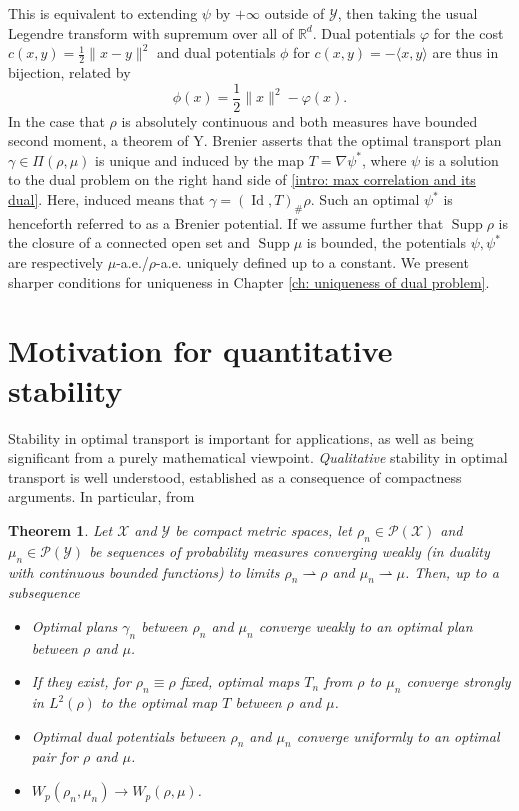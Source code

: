 \documentclass[11pt, oneside, titlepage]{book}
\theoremstyle{plain}
\newtheorem{theorem}{Theorem}[chapter]
\theoremstyle{definition}
\newcommand{\R}{\mathbb{R}}
\newcommand{\X}{\mathcal{X}}
\newcommand{\Y}{\mathcal{Y}}
\DeclareMathOperator{\id}{Id}
\DeclareMathOperator{\supp}{Supp}
\begin{document}
This is equivalent to extending $\psi$ by $+ \infty$ outside of $\Y$, then taking the usual Legendre transform with supremum over all of $\R^d$. Dual potentials $\varphi$ for the cost $c(x, y) = \frac{1}{2}\|x-y\|^2$ and dual potentials $\phi$ for $c(x, y) = -\langle x, y \rangle$ are thus in bijection, related by
\begin{equation*}
    \phi(x) = \frac{1}{2}\|x\|^2 - \varphi(x).
\end{equation*}
In the case that $\rho$ is absolutely continuous and both measures have bounded second moment, a theorem of Y. Brenier \cite{brenier1991polar} asserts that the optimal transport plan $\gamma \in \Pi(\rho, \mu)$ is unique and induced by the map $T = \nabla \psi^*$, where $\psi$ is a solution to the dual problem on the right hand side of \eqref{intro: max correlation and its dual}. Here, induced means that $\gamma = (\id, T)_\#\rho$. Such an optimal $\psi^*$ is henceforth referred to as a Brenier potential. If we assume further that  $\supp\rho$ is the closure of a connected open set and $\supp \mu$ is bounded, the potentials $\psi, \psi^*$ are respectively $\mu$-a.e./$\rho$-a.e. uniquely defined up to a constant\cite[Proposition 7.18]{santambrogio2015optimal}. We present sharper conditions for uniqueness in Chapter \ref{ch: uniqueness of dual problem}.




\section{Motivation for quantitative stability}


Stability in optimal transport is important for applications, as well as being significant from a purely mathematical viewpoint. \textit{Qualitative} stability in optimal transport is well understood, established as a consequence of compactness arguments. In particular, from \cite[Section 1.6.4]{santambrogio2015optimal}
\begin{theorem}
\label{intro: qualitative stability}
    Let $\X$ and $\Y$ be compact metric spaces, let $\rho_n \in \mathcal{P}(\X)$ and $\mu_n \in \mathcal{P}(\Y)$ be sequences of probability measures converging weakly (in duality with continuous bounded functions) to limits  $ \rho_n \rightharpoonup \rho$ and $\mu_n \rightharpoonup \mu$. Then, up to a subsequence
    \begin{itemize}
        \item Optimal plans $\gamma_n$ between $\rho_n$ and $\mu_n$ converge weakly to an optimal plan between $\rho$ and $\mu$.
        \item If they exist, for $\rho_n \equiv \rho$ fixed, optimal maps $T_n$ from $\rho$ to $\mu_n$ converge strongly in $L^2(\rho)$ to the optimal map $T$ between $\rho$ and $\mu$.
        \item Optimal dual potentials between $\rho_n$ and $\mu_n$ converge uniformly to an optimal pair for $\rho$ and $\mu$.
        \item $W_p(\rho_n, \mu_n) \to W_p(\rho, \mu)$.
    \end{itemize}
\end{theorem}
\end{document}
